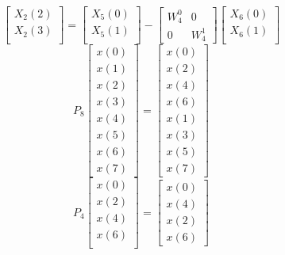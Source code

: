 \documentclass[journal,12pt,twocolumn]{IEEEtran}
\renewcommand\thesection{\arabic{section}}
\begin{document}
\begin{enumerate}[label=\thesection.\arabic*.,ref=\thesection.\theenumi]
\begin{equation}
\begin{bmatrix}
X_{2}(2) \\ 
X_{2}(3)\\ 
\end{bmatrix}
=
\begin{bmatrix}
X_{5}(0) \\ 
X_{5}(1)\\ 
\end{bmatrix}
-
\begin{bmatrix}
W^{0}_{4} & 0\\
0 & W^{1}_{4}
\end{bmatrix}
\begin{bmatrix}
X_{6}(0) \\ 
X_{6}(1) \\ 
\end{bmatrix}
\end{equation}
\begin{equation}
P_{8}
\begin{bmatrix}
x(0) \\ 
x(1) \\ 
x(2) \\ 
x(3) \\ 
x(4) \\ 
x(5) \\
x(6) \\
x(7)
\end{bmatrix}
 = 
\begin{bmatrix}
x(0) \\ 
x(2) \\ 
x(4) \\ 
x(6) \\
x(1) \\ 
x(3) \\ 
x(5) \\
x(7)
\end{bmatrix}
\end{equation}
\begin{equation}
P_{4}
\begin{bmatrix}
x(0) \\ 
x(2) \\ 
x(4) \\ 
x(6) \\
\end{bmatrix}
 = 
\begin{bmatrix}
x(0) \\ 
x(4) \\ 
x(2) \\
x(6)
\end{bmatrix}

\end{equation}
\end{enumerate}
\end{document}
